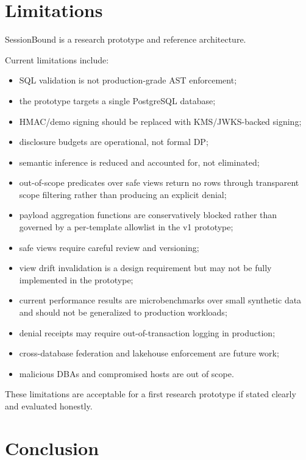 \documentclass[
]{article}
\providecommand{\tightlist}{%
  \setlength{\itemsep}{0pt}\setlength{\parskip}{0pt}}
\begin{document}
\hypertarget{limitations}{%
\section{Limitations}\label{limitations}}

SessionBound is a research prototype and reference architecture.

Current limitations include:

\begin{itemize}
\tightlist
\item
  SQL validation is not production-grade AST enforcement;
\item
  the prototype targets a single PostgreSQL database;
\item
  HMAC/demo signing should be replaced with KMS/JWKS-backed signing;
\item
  disclosure budgets are operational, not formal DP;
\item
  semantic inference is reduced and accounted for, not eliminated;
\item
  out-of-scope predicates over safe views return no rows through
  transparent scope filtering rather than producing an explicit denial;
\item
  payload aggregation functions are conservatively blocked rather than
  governed by a per-template allowlist in the v1 prototype;
\item
  safe views require careful review and versioning;
\item
  view drift invalidation is a design requirement but may not be fully
  implemented in the prototype;
\item
  current performance results are microbenchmarks over small synthetic
  data and should not be generalized to production workloads;
\item
  denial receipts may require out-of-transaction logging in production;
\item
  cross-database federation and lakehouse enforcement are future work;
\item
  malicious DBAs and compromised hosts are out of scope.
\end{itemize}

These limitations are acceptable for a first research prototype if
stated clearly and evaluated honestly.


\hypertarget{conclusion}{%
\section{Conclusion}\label{conclusion}}
\end{document}
